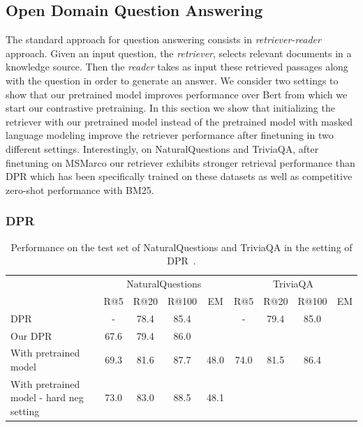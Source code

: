 \subsection{Open Domain Question Answering}

The standard approach for question answering consists in \emph{retriever-reader} approach.
Given an input question, the \emph{retriever}, selects relevant documents in a knowledge source. Then the \emph{reader} takes as input these retrieved passages along with the question in order to generate an answer.
We consider two settings to show that our pretrained model improves performance over Bert from which we start our contrastive pretraining.
In this section we show that initializing the retriever with our pretrained model instead of the pretrained model with masked language modeling improve the retriever performance after finetuning in two different settings. 
Interestingly, on NaturalQuestions and TriviaQA, after finetuning on MSMarco our retriever exhibits stronger retrieval performance than DPR which has been specifically trained on these datasets as well as competitive zero-shot performance with BM25.

\subsubsection{DPR}


\begin{table}[h!]
\centering
\begin{tabular}{l|cccc | cccc} 
 \toprule
  & \multicolumn{4}{c}{NaturalQuestions} & \multicolumn{4}{c}{TriviaQA} \\
  & R@5 & R@20 & R@100 & EM & R@5 & R@20 & R@100 & EM\\ 
 \midrule
 DPR~\citep{karpukhin2020dense} & - &  78.4 & 85.4 & & - & 79.4 & 85.0\\ 
 Our DPR & 67.6 & 79.4 & 86.0 & & & & &\\
 With pretrained model & 69.3 & 81.6 & 87.7 & 48.0 & 74.0 & 81.5 & 86.4\\
 With pretrained model - hard neg setting & 73.0 & 83.0 & 88.5 & 48.1 \\
 \bottomrule
\end{tabular}
\caption{Performance on the test set of NaturalQuestions and TriviaQA in the setting of DPR~\citep{karpukhin2020dense}.}
\label{tab:dpr}
\end{table}



